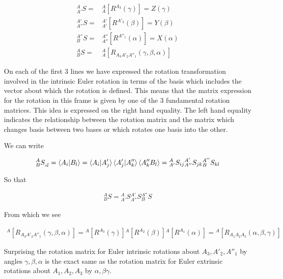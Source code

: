 \documentclass[12pt]{article}
\begin{document}
\begin{align}
{^{A}_{A'} S} =& {^A_A[R^{A_3}(\gamma)]} = Z(\gamma)\\
{^{A'}_{A''} S} =&{^{A'}_{A'}[R^{A'_2}(\beta)]} = Y(\beta)\\
{^{A''}_{B} S} =& {^{A''}_{A''}[R^{A''_1}(\alpha)]} = X(\alpha)\\
{^A_B S} = & {^A_A [R_{A_3 A'_2 A''_1}(\gamma, \beta, \alpha)]}
\end{align}

On each of the first 3 lines we have expressed the rotation transformation involved in the intrinsic Euler rotation in terms of the basis which includes the vector about which the rotation is defined.
This means that the matrix expression for the rotation in this frame is given by one of the 3 fundamental rotation matrices.
This idea is expressed on the right hand equality.
The left hand equality indicates the relationship between the rotation matrix and the matrix which changes basis between two bases or which rotates one basis into the other.

We can write

\begin{align}
{^A_B S}_{il} = \braket{A_i | B_l} = \braket{A_i | A'_j} \braket{A'_j | A''_k} \braket{A''_k B_l} = {^A_{A'} S_{ij}} {^{A'}_{A''} S_{jk}} {^{A''}_B S_{kl}}
\end{align}

So that

\begin{align}
{^A_B}S = {^{A}_{A'}S} {^{A'}_{A''}S} {^{A''}_{B} S}
\end{align}

From which we see

\begin{align}
{^A[R_{A_3 A'_2 A''_1}(\gamma, \beta, \alpha)]} = {^A[R^{A_3}(\gamma)]} {^A[R^{A_2}(\beta)]} {^A[R^{A_1}(\alpha)]} = {^A[R_{A_1 A_2 A_3}(\alpha, \beta, \gamma)]}
\end{align}

Surprising the rotation matrix for Euler intrinsic rotations about $A_3, A'_2, A''_1$ by angles $\gamma, \beta, \alpha$ is the exact same as the rotation matrix for Euler extrinsic rotations about $A_1, A_2, A_3$ by $\alpha, \beta \gamma$.
\end{document}
